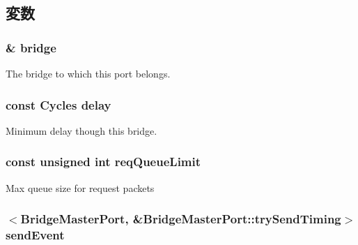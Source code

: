 \subsection{変数}
\hypertarget{classBridge_1_1BridgeMasterPort_a6d3b24e49ac986064571195ab9905136}{
\subsubsection[{bridge}]{\& {\bf bridge}}}
\label{classBridge_1_1BridgeMasterPort_a6d3b24e49ac986064571195ab9905136}
The bridge to which this port belongs. \hypertarget{classBridge_1_1BridgeMasterPort_a153dd7cdfa9816427cbbe84dce923c8d}{
\subsubsection[{delay}]{\setlength{\rightskip}{0pt plus 5cm}const {\bf Cycles} {\bf delay}}}
\label{classBridge_1_1BridgeMasterPort_a153dd7cdfa9816427cbbe84dce923c8d}
Minimum delay though this bridge. \hypertarget{classBridge_1_1BridgeMasterPort_abe7df187a5de0c89447640be0c8d6f87}{
\subsubsection[{reqQueueLimit}]{\setlength{\rightskip}{0pt plus 5cm}const unsigned int {\bf reqQueueLimit}}}
\label{classBridge_1_1BridgeMasterPort_abe7df187a5de0c89447640be0c8d6f87}
Max queue size for request packets \hypertarget{classBridge_1_1BridgeMasterPort_ac65e9e742d994553fd80b8b38c2bd5dd}{
\subsubsection[{sendEvent}]{$<${\bf BridgeMasterPort}, \&BridgeMasterPort::trySendTiming$>$ {\bf sendEvent}}}
